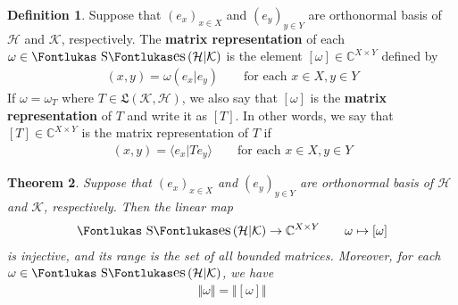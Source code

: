 \documentclass[12pt,b5paper,notitlepage]{article}
\theoremstyle{definition}
\newtheorem{df}{Definition}[section]
\theoremstyle{plain}
\newtheorem{thm}[df]{Theorem}
\DeclareMathOperator{\Ses}{\text{\Fontlukas S}\text{\kern -0pt {\Fontlukas\large es}}\,}
\newcommand{\fk}{\mathfrak}
\newcommand{\bk}[1]{\langle {#1}\rangle}
\newcommand{\Cbb}{\mathbb C}
\newcommand{\MH}{\mathcal H}
\newcommand{\MK}{\mathcal K}
\numberwithin{equation}{section}
\begin{document}
\begin{df}
Suppose that $(e_x)_{x\in X}$ and $(e_y)_{y\in Y}$ are orthonormal basis of $\MH$ and $\MK$, respectively. The \textbf{matrix representation}  of each $\omega\in\Ses(\MH|\MK)$ is the element $[\omega]\in\Cbb^{X\times Y}$ defined by
\begin{align*}
[\omega](x,y)=\omega(e_x|e_y)\qquad\text{for each }x\in X,y\in Y
\end{align*}  
If $\omega=\omega_T$ where $T\in\fk L(\MK,\MH)$, we also say that $[\omega]$ is the \textbf{matrix representation} of $T$ and write it as $[T]$. In other words, we say that $[T]\in\Cbb^{X\times Y}$ is the matrix representation of $T$ if
\begin{align*}
[T](x,y)=\bk{e_x|Te_y}\qquad\text{for each }x\in X,y\in Y
\end{align*}
\end{df}



\begin{thm}\label{lb142}
Suppose that $(e_x)_{x\in X}$ and $(e_y)_{y\in Y}$ are orthonormal basis of $\MH$ and $\MK$, respectively. Then the linear map
\begin{gather}\label{eq70}
\Ses(\MH|\MK)\rightarrow\Cbb^{X\times Y}\qquad \omega\mapsto[\omega]
\end{gather}
is injective, and its range is the set of all bounded matrices. Moreover, for each $\omega\in\Ses(\MH|\MK)$, we have
\begin{align*}
\big\Vert\omega\big\Vert=\big\Vert[\omega]\big\Vert
\end{align*}
\end{thm}
\end{document}
